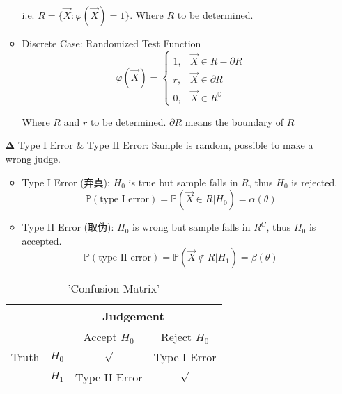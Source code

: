 \begin{itemize}[topsep = -3 pt]
\begin{itemize}
        i.e. $R=\{\vec{X}:\varphi(\vec{X})=1\}$. Where $R$ to be determined.

        \item Discrete Case: Randomized Test Function
        \begin{equation}
        \varphi(\vec{X})=\begin{cases}
            1,&\vec{X}\in R-\partial R\\
            r,&\vec{X}\in \partial R\\
            0,&\vec{X}\in R^\complement
        \end{cases}    
        \end{equation}

        Where $R$ and $r$  to be determined. $\partial R$ means the boundary of $ R $
    \end{itemize}
        \item[$ \bm{\Delta } $] Type I Error \& Type II Error: Sample is random, possible to make a wrong judge.
            
        \begin{itemize}[topsep = -4 pt]
            \item Type I Error (弃真): $H_0$ is true but sample falls in $R$, thus $H_0$ is rejected.
            \begin{equation}\mathbb{P}(\text{type I error})=\mathbb{P}(\vec{X}\in R|H_0)=\alpha(\theta)\end{equation}
            \item Type II Error (取伪): $H_0$ is wrong but sample falls in $R^C$, thus $H_0$ is accepted.
            \begin{equation}\mathbb{P}(\text{type II error})=\mathbb{P}(\vec{X}\notin R|H_1)=\beta(\theta)\end{equation}
        \end{itemize}

    \begin{table}[htbp]
        \centering
        \begin{tabular}{c|ccc}
            \hline
            &\multicolumn{3}{c}{Judgement}\\
            \hline
            \multirow{3}{*}{Truth}&&Accept $H_0$&Reject $H_0$\\ 
            &$H_0$&$\surd$&Type I Error\\ 
            &$H_1$&Type II Error&$\surd$\\ 
            \hline
        \end{tabular}
        \caption{'Confusion Matrix'}
    \end{table}


\end{itemize}

